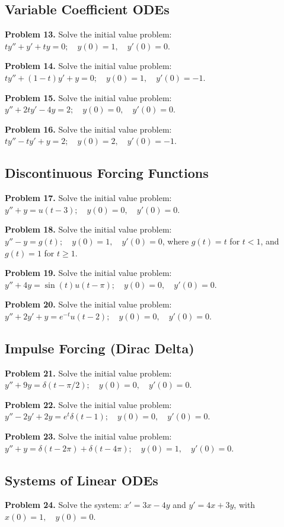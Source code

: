 \documentclass[11pt, letterpaper]{article}
\theoremstyle{definition}
\theoremstyle{remark}
\begin{document}
\subsection{Variable Coefficient ODEs}
\textbf{Problem 13.} Solve the initial value problem: $ty'' + y' + ty = 0; \quad y(0) = 1, \quad y'(0) = 0$.

\textbf{Problem 14.} Solve the initial value problem: $ty'' + (1-t)y' + y = 0; \quad y(0) = 1, \quad y'(0) = -1$.

\textbf{Problem 15.} Solve the initial value problem: $y'' + 2ty' - 4y = 2; \quad y(0) = 0, \quad y'(0) = 0$.

\textbf{Problem 16.} Solve the initial value problem: $ty'' - ty' + y = 2; \quad y(0) = 2, \quad y'(0) = -1$.

\subsection{Discontinuous Forcing Functions}
\textbf{Problem 17.} Solve the initial value problem: $y'' + y = u(t-3); \quad y(0) = 0, \quad y'(0) = 0$.

\textbf{Problem 18.} Solve the initial value problem: $y'' - y = g(t); \quad y(0) = 1, \quad y'(0) = 0$, where $g(t) = t$ for $t < 1$, and $g(t) = 1$ for $t \ge 1$.

\textbf{Problem 19.} Solve the initial value problem: $y'' + 4y = \sin(t)u(t-\pi); \quad y(0) = 0, \quad y'(0) = 0$.

\textbf{Problem 20.} Solve the initial value problem: $y'' + 2y' + y = e^{-t}u(t-2); \quad y(0) = 0, \quad y'(0) = 0$.

\subsection{Impulse Forcing (Dirac Delta)}
\textbf{Problem 21.} Solve the initial value problem: $y'' + 9y = \delta(t-\pi/2); \quad y(0) = 0, \quad y'(0) = 0$.

\textbf{Problem 22.} Solve the initial value problem: $y'' - 2y' + 2y = e^t \delta(t-1); \quad y(0) = 0, \quad y'(0) = 0$.

\textbf{Problem 23.} Solve the initial value problem: $y'' + y = \delta(t-2\pi) + \delta(t-4\pi); \quad y(0) = 1, \quad y'(0) = 0$.

\subsection{Systems of Linear ODEs}
\textbf{Problem 24.} Solve the system: $x' = 3x - 4y$ and $y' = 4x + 3y$, with $x(0) = 1, \quad y(0) = 0$.
\end{document}

